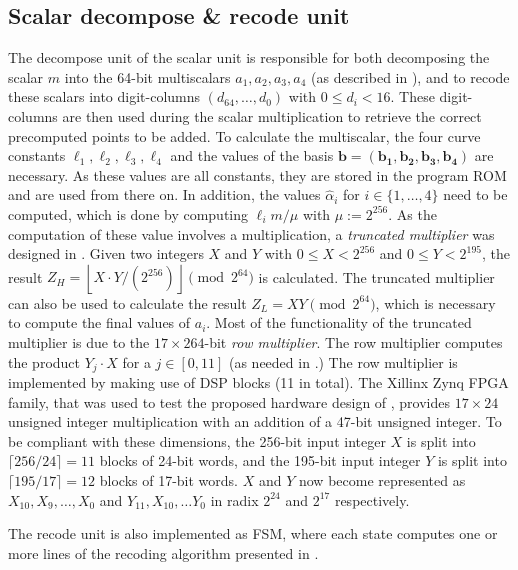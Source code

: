 \subsection{Scalar decompose \& recode unit}
The decompose unit of the scalar unit is responsible for both decomposing the scalar $m$ into the 64-bit multiscalars $a_1, a_2, a_3, a_4$ (as described in ), and to recode these scalars into digit-columns $(d_{64}, \ldots , d_0)$ with $0 \le d_i < 16$.
These digit-columns are then used during the scalar multiplication to retrieve the correct precomputed points to be added.
To calculate the multiscalar, the four curve constants $\ell_1, \ell_2, \ell_3, \ell_4$ and the values of the basis $\bm{b} = (\bm{b_1}, \bm{b_2}, \bm{b_3}, \bm{b_4})$ are necessary.
As these values are all constants, they are stored in the program ROM and are used from there on.
In addition, the values $\hat{\alpha}_i$ for $i \in \{1, \ldots, 4 \}$ need to be computed, which is done by computing $\ell_i m / \mu$ with $\mu := 2^{256}$.
As the computation of these value involves a multiplication, a \emph{truncated multiplier} was designed in \cite[Algorithm 3]{jarvinen2016four}.
Given two integers $X$ and $Y$ with $0 \le X < 2^{256}$ and $0 \le Y < 2^{195}$, the result $Z_H = \left \lfloor X \cdot Y / (2^{256})\right \rfloor \pmod{2^{64}}$ is calculated.
The truncated multiplier can also be used to calculate the result $Z_L = XY \pmod{2^{64}}$, which is necessary to compute the final values of $a_i$.
Most of the functionality of the truncated multiplier is due to the $17 \times 264$-bit \emph{row multiplier}.
The row multiplier computes the product $Y_j \cdot X$ for a $j \in [0, 11]$ (as needed in \cite[Algorithm 3 line 5]{jarvinen2016four}.) 
The row multiplier is implemented by making use of DSP blocks (11 in total).
The Xillinx Zynq FPGA family, that was used to test the proposed hardware design of {\fourq}, provides $17\times 24$ unsigned integer multiplication with an addition of a 47-bit unsigned integer. 
To be compliant with these dimensions, the 256-bit input integer $X$ is split into $\lceil 256 / 24 \rceil = 11$ blocks of 24-bit words, and the 195-bit input integer $Y$ is split into $\lceil 195 / 17 \rceil = 12$ blocks of 17-bit words.
$X$ and $Y$ now become represented as $X_{10}, X_9, \ldots, X_0$ and $Y_{11}, X_{10}, \ldots Y_0$ in radix $2^{24}$ and $2^{17}$ respectively.

The recode unit is also implemented as FSM, where each state computes one or more lines of the recoding algorithm presented in \cite{costello2015fourq}.
